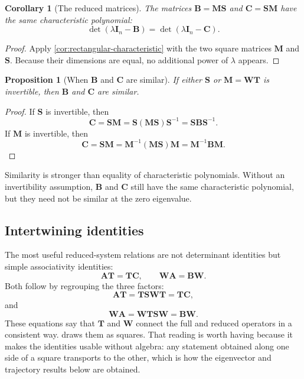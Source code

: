 \documentclass[11pt]{article}
\newcommand{\I}{\mathbf{I}}
\newcommand{\mat}[1]{\mathbf{#1}}
\newtheorem{proposition}[proposition]{Proposition}
\newtheorem{corollary}[corollary]{Corollary}
\theoremstyle{definition}
\theoremstyle{remark}
\begin{document}
\begin{corollary}[The reduced matrices]
\label{cor:B-C-spectrum}
The matrices \(\mat{B}=\mat{M}\mat{S}\) and
\(\mat{C}=\mat{S}\mat{M}\) have the same characteristic polynomial:
\begin{equation}
  \det(\lambda\I_n-\mat{B})
  =
  \det(\lambda\I_n-\mat{C}).
  \label{eq:B-C-characteristic}
\end{equation}
\end{corollary}

\begin{proof}
Apply \cref{cor:rectangular-characteristic} with the two square matrices
\(\mat{M}\) and \(\mat{S}\). Because their dimensions are equal, no additional power of \(\lambda\) appears.
\end{proof}

\begin{proposition}[When \(\mat{B}\) and \(\mat{C}\) are similar]
\label{prop:B-C-similar}
If either \(\mat{S}\) or \(\mat{M}=\mat{W}\mat{T}\) is invertible, then \(\mat{B}\) and \(\mat{C}\) are similar.
\end{proposition}

\begin{proof}
If \(\mat{S}\) is invertible, then
\[
  \mat{C}
  =\mat{S}\mat{M}
  =\mat{S}(\mat{M}\mat{S})\mat{S}^{-1}
  =\mat{S}\mat{B}\mat{S}^{-1}.
\]
If \(\mat{M}\) is invertible, then
\[
  \mat{C}
  =\mat{S}\mat{M}
  =\mat{M}^{-1}(\mat{M}\mat{S})\mat{M}
  =\mat{M}^{-1}\mat{B}\mat{M}.
\]
\end{proof}

Similarity is stronger than equality of characteristic polynomials. Without an invertibility assumption, \(\mat{B}\) and \(\mat{C}\) still have the same characteristic polynomial, but they need not be similar at the zero eigenvalue.

\subsection{Intertwining identities}

The most useful reduced-system relations are not determinant identities but simple associativity identities:
\begin{equation}
  \mat{A}\mat{T}
  =\mat{T}\mat{C},
  \qquad
  \mat{W}\mat{A}
  =\mat{B}\mat{W}.
  \label{eq:intertwining}
\end{equation}
Both follow by regrouping the three factors:
\[
  \mat{A}\mat{T}
  =\mat{T}\mat{S}\mat{W}\mat{T}
  =\mat{T}\mat{C},
\]
and
\[
  \mat{W}\mat{A}
  =\mat{W}\mat{T}\mat{S}\mat{W}
  =\mat{B}\mat{W}.
\]
These equations say that \(\mat{T}\) and \(\mat{W}\) connect the full and reduced operators in a consistent way.  draws them as squares. That reading is worth having because it makes the identities usable without algebra: any statement obtained along one side of a square transports to the other, which is how the eigenvector and trajectory results below are obtained.
\end{document}
